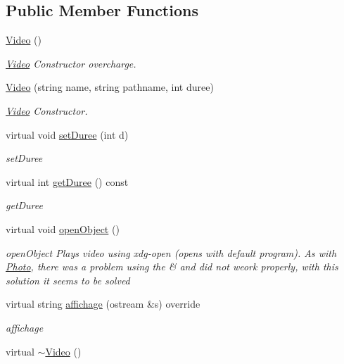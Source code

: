 \subsection*{Public Member Functions}
\begin{DoxyCompactItemize}
\item 
\hypertarget{classVideo_ab67336c2c5b6227a9635bc7dcd6af543}{\hyperlink{classVideo_ab67336c2c5b6227a9635bc7dcd6af543}{Video} ()}\label{classVideo_ab67336c2c5b6227a9635bc7dcd6af543}

\begin{DoxyCompactList}\small\item\em \hyperlink{classVideo}{Video} Constructor overcharge. \end{DoxyCompactList}\item 
\hyperlink{classVideo_ab5a0624db51e978d6d87aa40012885d7}{Video} (string name, string pathname, int duree)
\begin{DoxyCompactList}\small\item\em \hyperlink{classVideo}{Video} Constructor. \end{DoxyCompactList}\item 
virtual void \hyperlink{classVideo_af9bf19109d8c613426173524942a59f0}{set\-Duree} (int d)
\begin{DoxyCompactList}\small\item\em set\-Duree \end{DoxyCompactList}\item 
virtual int \hyperlink{classVideo_a6ce28ec6b467212e7bb3cbf635b57598}{get\-Duree} () const 
\begin{DoxyCompactList}\small\item\em get\-Duree \end{DoxyCompactList}\item 
\hypertarget{classVideo_af6a8d2f22330651f3f264292e580dca3}{virtual void \hyperlink{classVideo_af6a8d2f22330651f3f264292e580dca3}{open\-Object} ()}\label{classVideo_af6a8d2f22330651f3f264292e580dca3}

\begin{DoxyCompactList}\small\item\em open\-Object Plays video using xdg-\/open (opens with default program). As with \hyperlink{classPhoto}{Photo}, there was a problem using the \& and did not weork properly, with this solution it seems to be solved \end{DoxyCompactList}\item 
virtual string \hyperlink{classVideo_a180c985ff368f77d0fb66ec106106f00}{affichage} (ostream \&s) override
\begin{DoxyCompactList}\small\item\em affichage \end{DoxyCompactList}\item 
\hypertarget{classVideo_a07a39b94dddfa02e0b0d7b196e9c9f53}{virtual \hyperlink{classVideo_a07a39b94dddfa02e0b0d7b196e9c9f53}{$\sim$\-Video} ()}\label{classVideo_a07a39b94dddfa02e0b0d7b196e9c9f53}


\end{DoxyCompactItemize}
